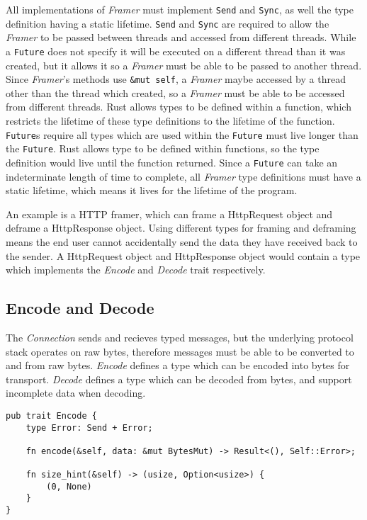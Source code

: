 All implementations of \emph{Framer} must implement \texttt{Send} and \texttt{Sync}, as well the type definition having
a static lifetime.
\texttt{Send} and \texttt{Sync} are required to allow the \emph{Framer} to be passed between threads and accessed from
different threads.
While a \texttt{Future} does not specify it will be executed on a different thread than it was created, but it allows
it so a \emph{Framer} must be able to be passed to another thread.
Since \emph{Framer}'s methods use \texttt{&mut self}, a \emph{Framer} maybe accessed by a thread other than the thread
which created, so a \emph{Framer} must be able to be accessed from different threads.
Rust allows types to be defined within a function, which restricts the lifetime of these type definitions to the
lifetime of the function.
\texttt{Future}s require all types which are used within the \texttt{Future} must live longer than the \texttt{Future}.
Rust allows type to be defined within functions, so the type definition would live until the function returned.
Since a \texttt{Future} can take an indeterminate length of time to complete, all \emph{Framer} type definitions must
have a static lifetime, which means it lives for the lifetime of the program.

An example is a HTTP framer, which can frame a HttpRequest object and deframe a HttpResponse object.
Using different types for framing and deframing means the end user cannot accidentally send the data they have received
back to the sender.
A HttpRequest object and HttpResponse object would contain a type which implements the \emph{Encode} and \emph{Decode}
trait respectively.

\subsection{Encode and Decode}\label{subsec:encode-and-decode}
The \emph{Connection} sends and recieves typed messages, but the underlying protocol stack operates on raw bytes,
therefore messages must be able to be converted to and from raw bytes.
\emph{Encode} defines a type which can be encoded into bytes for transport.
\emph{Decode} defines a type which can be decoded from bytes, and support incomplete data when decoding.

\begin{lstlisting}[float=h, label=lst:encode, caption={The Encode trait, showing the size\_hint method.}]
pub trait Encode {
    type Error: Send + Error;

    fn encode(&self, data: &mut BytesMut) -> Result<(), Self::Error>;

    fn size_hint(&self) -> (usize, Option<usize>) {
        (0, None)
    }
}
\end{lstlisting}

